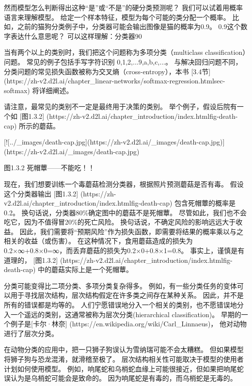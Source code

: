 然而模型怎么判断得出这种“是”或“不是”的硬分类预测呢？ 我们可以试着用概率语言来理解模型。 给定一个样本特征，模型为每个可能的类分配一个概率。 比如，之前的猫狗分类例子中，分类器可能会输出图像是猫的概率为0.9。 0.9这个数字表达什么意思呢？ 可以这样理解：分类器90%

当有两个以上的类别时，我们把这个问题称为多项分类（multiclass classification）问题。 常见的例子包括手写字符识别 {0,1,2,...9,a,b,c,...}。 与解决回归问题不同，分类问题的常见损失函数被称为交叉熵（cross-entropy），本书 [3.4节]
(https://zh-v2.d2l.ai/chapter\_linear-networks/softmax-regression.htmlsec-softmax) 
将详细阐述。

请注意，最常见的类别不一定是最终用于决策的类别。 举个例子，假设后院有一个如 [图1.3.2]
(https://zh-v2.d2l.ai/chapter\_introduction/index.htmlfig-death-cap) 
所示的蘑菇。

[![../\_images/death-cap.jpg](https://zh-v2.d2l.ai/\_images/death-cap.jpg)](https://zh-v2.d2l.ai/\_images/death-cap.jpg)

图1.3.2 死帽蕈——不能吃！！

现在，我们想要训练一个毒蘑菇检测分类器，根据照片预测蘑菇是否有毒。 假设这个分类器输出 [图1.3.2]
(https://zh-v2.d2l.ai/chapter\_introduction/index.htmlfig-death-cap) 
包含死帽蕈的概率是0.2。 换句话说，分类器80\%确定图中的蘑菇不是死帽蕈。 尽管如此，我们也不会吃它，因为不值得冒20\%的死亡风险。 换句话说，不确定风险的影响远远大于收益。 因此，我们需要将“预期风险”作为损失函数，即需要将结果的概率乘以与之相关的收益（或伤害）。 在这种情况下，食用蘑菇造成的损失为0.2×∞+0.8×0=∞，而丢弃蘑菇的损失为0.2×0+0.8×1=0.8。 事实上，谨慎是有道理的， [图1.3.2]
(https://zh-v2.d2l.ai/chapter\_introduction/index.htmlfig-death-cap)
中的蘑菇实际上是一个死帽蕈。

分类可能变得比二项分类、多项分类复杂得多。 例如，有一些分类任务的变体可以用于寻找层次结构，层次结构假定在许多类之间存在某种关系。 因此，并不是所有的错误都是均等的。 人们宁愿错误地分入一个相关的类别，也不愿错误地分入一个遥远的类别，这通常被称为层次分类(hierarchical classification)。 早期的一个例子是[卡尔·林奈]
(https://en.wikipedia.org/wiki/Carl\_Linnaeus)，
他对动物进行了层次分类。

在动物分类的应用中，把一只狮子狗误认为雪纳瑞可能不会太糟糕。 但如果模型将狮子狗与恐龙混淆，就滑稽至极了。 层次结构相关性可能取决于模型的使用者计划如何使用模型。 例如，响尾蛇和乌梢蛇血缘上可能很接近，但如果把响尾蛇误认为是乌梢蛇可能会是致命的。 因为响尾蛇是有毒的，而乌梢蛇是无毒的。

